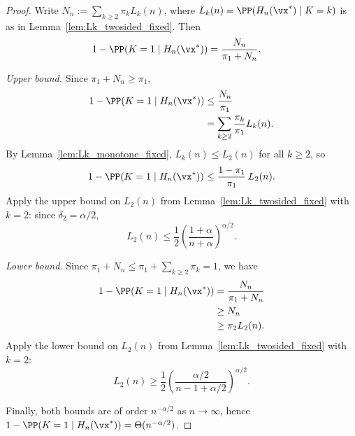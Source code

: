 \thmKOneTightRateFixed*
\begin{proof}\label{proof:K1_tight_fixed}
Write $N_n:=\sum_{k\ge 2}\pi_k L_k(n)$, where $L_k(n)=\PP(H_n(\vx^*)\mid K=k)$ is as in
Lemma~\ref{lem:Lk_twosided_fixed}. Then
\[
\begin{aligned}
1-\PP(K=1\mid H_n(\vx^*))
&=\frac{N_n}{\pi_1+N_n}.
\end{aligned}
\]

\emph{Upper bound.}
Since $\pi_1+N_n\ge \pi_1$,
\[
\begin{aligned}
1-\PP(K=1\mid H_n(\vx^*))
&\le \frac{N_n}{\pi_1}\\
&=\sum_{k\ge 2}\frac{\pi_k}{\pi_1}L_k(n).
\end{aligned}
\]
By Lemma~\ref{lem:Lk_monotone_fixed}, $L_k(n)\le L_2(n)$ for all $k\ge 2$, so
\[
1-\PP(K=1\mid H_n(\vx^*))\le \frac{1-\pi_1}{\pi_1}\,L_2(n).
\]
Apply the upper bound on $L_2(n)$ from Lemma~\ref{lem:Lk_twosided_fixed} with $k=2$:
since $\delta_2=\alpha/2$,
\[
L_2(n)\le \frac12\left(\frac{1+\alpha}{n+\alpha}\right)^{\alpha/2}.
\]

\emph{Lower bound.}
Since $\pi_1+N_n\le \pi_1+\sum_{k\ge 2}\pi_k=1$, we have
\[
\begin{aligned}
1-\PP(K=1\mid H_n(\vx^*))
&=\frac{N_n}{\pi_1+N_n}\\
&\ge N_n\\
&\ge \pi_2 L_2(n).
\end{aligned}
\]
Apply the lower bound on $L_2(n)$ from Lemma~\ref{lem:Lk_twosided_fixed} with $k=2$:
\[
L_2(n)\ge \frac12\left(\frac{\alpha/2}{n-1+\alpha/2}\right)^{\alpha/2}.
\]

Finally, both bounds are of order $n^{-\alpha/2}$ as $n\to\infty$, hence
$1-\PP(K=1\mid H_n(\vx^*))=\Theta(n^{-\alpha/2})$.
\end{proof}

